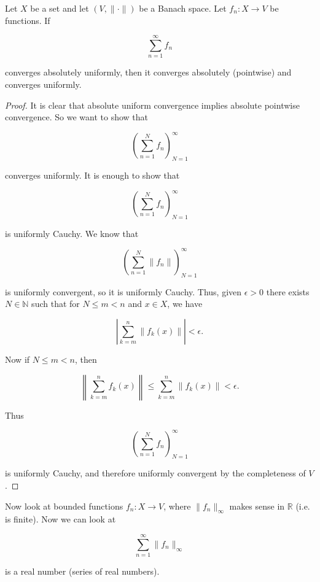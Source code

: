 \begin{proposition}

Let \(X\) be a set and let \((V, \lVert \cdot \rVert)\) be a Banach space. Let \(f_n: X \to V\) be functions. If 

\[
\sum_{n=1}^\infty f_n
\]

converges absolutely uniformly, then it converges absolutely (pointwise) and converges uniformly.

\end{proposition}

\begin{proof}

It is clear that absolute uniform convergence implies absolute pointwise convergence. So we want to show that 

\[
\left( \sum_{n=1}^N  f_n \right)_{N= 1}^\infty
\]

converges uniformly. It is enough to show that 


\[
\left( \sum_{n=1}^N  f_n \right)_{N= 1}^\infty
\]

is uniformly Cauchy. We know that 


\[
\left( \sum_{n=1}^N \lVert f_n \rVert  \right)_{N= 1}^\infty
\]

is uniformly convergent, so it is uniformly Cauchy. Thus, given \(\epsilon > 0\) there exists \(N \in \mathbb{N}\) such that for \(N \leq m < n\) and \(x \in X\), we have

\[
\left| \sum_{k=m}^n \lVert f_k(x) \rVert \right| < \epsilon.
\]

Now if \(N \leq m < n\), then

\[
\left\lVert   \sum_{k=m}^n  f_k(x) \right\rVert \leq  \sum_{k=m}^n   \left\lVert   f_k(x) \right\rVert < \epsilon.
\]

Thus

\[
\left( \sum_{n=1}^N  f_n \right)_{N= 1}^\infty
\]

is uniformly Cauchy, and therefore uniformly convergent by the completeness of \(V\).

\end{proof}

Now look at bounded functions \(f_n: X \to V\), where \(\lVert f_n \rVert_\infty\) makes sense in \(\mathbb{R}\) (i.e. is finite). Now we can look at

\[
\sum_{n=1}^\infty \lVert f_n \rVert_\infty
\]

is a real number (series of real numbers).

